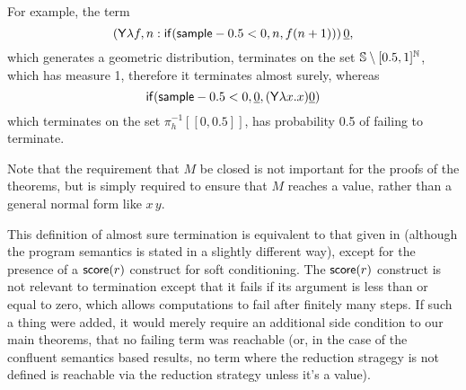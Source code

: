 \iffalse
\lo{Alternatively, define the \emph{runtime of $M$} to be the random variable 
\[
T_M(s) := 
\begin{cases}
\min \set{n \mid \pi_0(\red^n(M, s)) \textrm{ is a value}} & \hbox{if $\red^\infty(M,s)$ is defined}\\
\infty & \hbox{otherwise}
\end{cases}
\]
Equivalently, we say that $M$ is \emph{almost surely terminating} (AST) if $T_M < \infty$ a.s.; 
and $M$ is \emph{positively almost surely terminating} (PAST) if $\expect{T_M} < \infty$.}
\fi
For example, the term 
\[
(\mathsf{Y} \lambda f, n: \mathsf{if}(\mathsf{sample} - 0.5 < 0, n, f (n+1)) ) \, \underline{0},
\] 
which generates a geometric distribution, terminates on the set ${\mathbb{S}} \setminus [0.5,1]^\mathbb N$, which has measure 1, therefore it terminates almost surely, whereas 
\[
\mathsf{if}(\mathsf{sample} - 0.5 < 0, \underline 0, (\mathsf{Y} \lambda x. x) \underline 0)
\] 
which terminates on the set $\pi_h^{-1}[[0,0.5]]$, has probability 0.5 of failing to terminate.

Note that the requirement that $M$ be closed is not important for the proofs of the theorems, but is simply required to ensure that $M$ reaches a value, rather than a general normal form like $x \, y$.

\begin{remark}
\label{rem:score}
This definition of almost sure termination is equivalent to that given in \citep{MakOPW21} (although the program semantics is stated in a slightly different way), except for the presence of a $\mathsf{score}(r)$ construct for soft conditioning. 
The $\mathsf{score}(r)$ construct is not relevant to termination except that it fails if its argument is less than or equal to zero, which allows computations to fail after finitely many steps. 
If such a thing were added, it would merely require an additional side condition to our main theorems, that no failing term was reachable (or, in the case of the confluent semantics based results, no term where the reduction stragegy is not defined is reachable via the reduction strategy unless it's a value).
\end{remark}

\iffalse
\lo{Your operational semantics does not maintain a record of the current weight of the reduction.
A.s.~termination does depend on $\tscore$: see \cite[\S 4.3]{MakOPW21}\footnote{\url{https://arxiv.org/abs/2004.03924}}.
I think it important to take the behaviour of $\tscore$ into account;
you should do it as a future task.}
\fi
